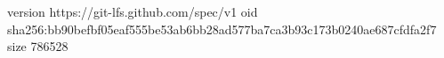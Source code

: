 version https://git-lfs.github.com/spec/v1
oid sha256:bb90befbf05eaf555be53ab6bb28ad577ba7ca3b93c173b0240ae687cfdfa2f7
size 786528
